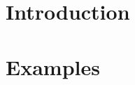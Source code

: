 \documentclass{book}
\begin{document}
\frontmatter

\beforeabstract


%

%

\afterabstract

\afterpreface
\mainmatter

\renewcommand{\chaptermark}[1]{\markboth{{\thechapter.\ #1}}{}}

\chapter{Introduction}
\label{chapter:introduction} %

\chapter{Examples}



%



\cleardoublepage
{}
{}
\setlength{\bibsep}{7pt}
{\footnotesize }
\end{document}
